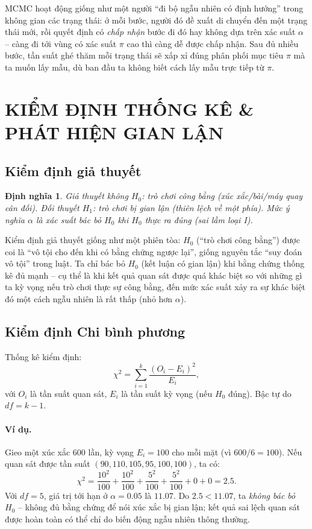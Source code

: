 \documentclass[12pt,a4paper]{article}
\theoremstyle{coloredthm}
\theoremstyle{coloreddef}
\newtheorem{definition}[theorem]{Định nghĩa}
\theoremstyle{remark}
\begin{document}
\begin{giaithich}
MCMC hoạt động giống như một người ``đi bộ ngẫu nhiên có định hướng'' trong không gian các trạng thái: ở mỗi bước, người đó đề xuất di chuyển đến một trạng thái mới, rồi quyết định có \emph{chấp nhận} bước đi đó hay không dựa trên xác suất $\alpha$ -- càng đi tới vùng có xác suất $\pi$ cao thì càng dễ được chấp nhận. Sau đủ nhiều bước, tần suất ghé thăm mỗi trạng thái sẽ xấp xỉ đúng phân phối mục tiêu $\pi$ mà ta muốn lấy mẫu, dù ban đầu ta không biết cách lấy mẫu trực tiếp từ $\pi$.
\end{giaithich}

\section{KIỂM ĐỊNH THỐNG KÊ \& PHÁT HIỆN GIAN LẬN}

\subsection{Kiểm định giả thuyết}

\begin{definition}
Giả thuyết không $H_0$: trò chơi công bằng (xúc xắc/bài/máy quay cân đối). Đối thuyết $H_1$: trò chơi bị gian lận (thiên lệch về một phía).
Mức ý nghĩa $\alpha$ là xác suất bác bỏ $H_0$ khi $H_0$ thực ra đúng (sai lầm loại I).
\end{definition}

\begin{giaithich}
Kiểm định giả thuyết giống như một phiên tòa: $H_0$ (``trò chơi công bằng'') được coi là ``vô tội cho đến khi có bằng chứng ngược lại'', giống nguyên tắc ``suy đoán vô tội'' trong luật. Ta chỉ bác bỏ $H_0$ (kết luận có gian lận) khi bằng chứng thống kê đủ mạnh -- cụ thể là khi kết quả quan sát được quá khác biệt so với những gì ta kỳ vọng nếu trò chơi thực sự công bằng, đến mức xác suất xảy ra sự khác biệt đó một cách ngẫu nhiên là rất thấp (nhỏ hơn $\alpha$).
\end{giaithich}

\subsection{Kiểm định Chi bình phương}

Thống kê kiểm định:
\[
\chi^2 = \sum_{i=1}^k \frac{(O_i - E_i)^2}{E_i},
\]
với $O_i$ là tần suất quan sát, $E_i$ là tần suất kỳ vọng (nếu $H_0$ đúng). Bậc tự do $df = k - 1$.

\paragraph{Ví dụ.} Gieo một xúc xắc $600$ lần, kỳ vọng $E_i = 100$ cho mỗi mặt (vì $600/6=100$). Nếu quan sát được tần suất $(90, 110, 105, 95, 100, 100)$, ta có:
\[
\chi^2 = \frac{10^2}{100} + \frac{10^2}{100} + \frac{5^2}{100} + \frac{5^2}{100} + 0 + 0 = 2.5.
\]
Với $df = 5$, giá trị tới hạn ở $\alpha = 0.05$ là $11.07$. Do $2.5 < 11.07$, ta \emph{không bác bỏ} $H_0$ -- không đủ bằng chứng để nói xúc xắc bị gian lận; kết quả sai lệch quan sát được hoàn toàn có thể chỉ do biến động ngẫu nhiên thông thường.
\end{document}
